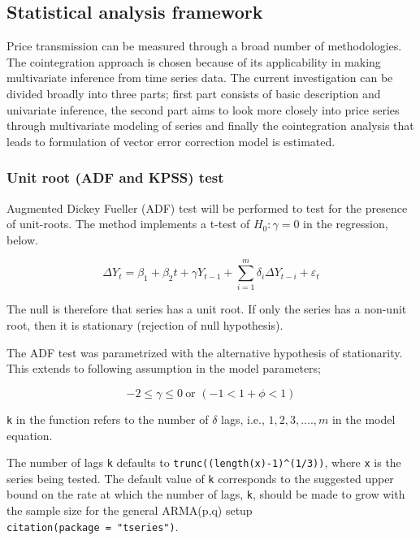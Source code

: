 \documentclass[12pt,]{article}
\begin{document}
\hypertarget{statistical-analysis-framework}{%
\subsection{Statistical analysis framework}\label{statistical-analysis-framework}}

Price transmission can be measured through a broad number of methodologies. The cointegration approach is chosen because of its applicability in making multivariate inference from time series data. The current investigation can be divided broadly into three parts; first part consists of basic description and univariate inference, the second part aims to look more closely into price series through multivariate modeling of series and finally the cointegration analysis that leads to formulation of vector error correction model is estimated.

\hypertarget{unit-root-adf-and-kpss-test}{%
\subsubsection{Unit root (ADF and KPSS) test}\label{unit-root-adf-and-kpss-test}}

Augmented Dickey Fueller (ADF) test will be performed to test for the presence of unit-roots. The method implements a t-test of \(H_0: \gamma = 0\) in the regression, below.

\begin{equation}
\label{eqn:lagged-ts-regression}
  \Delta {{Y}_{t}}={{\beta
  }_{1}}+{{\beta }_{2}}t+\gamma {{Y}_{t-1}}+ \sum\limits_{i=1}^{m}{\delta_i \Delta
    {{Y}_{t-i}}+{{\varepsilon }_{t}}}
\end{equation}

The null is therefore that series has a unit root. If only the series has a non-unit root, then it is stationary (rejection of null hypothesis).

The ADF test was parametrized with the alternative hypothesis of stationarity. This extends to following assumption in the model parameters;

\[
-2 \leq \gamma \leq 0\ \text{or } (-1 < 1+\phi < 1)
\]

\texttt{k} in the function refers to the number of \(\delta\) lags, i.e., \(1, 2, 3, ...., m\) in the model equation.

The number of lags \texttt{k} defaults to \texttt{trunc((length(x)-1)\^{}(1/3))}, where \texttt{x} is the series being tested. The default value of \texttt{k} corresponds to the suggested upper bound on the rate at which the number of lags, \texttt{k}, should be made to grow with the sample size for the general ARMA(p,q) setup \texttt{citation(package\ =\ "tseries")}.
\end{document}
